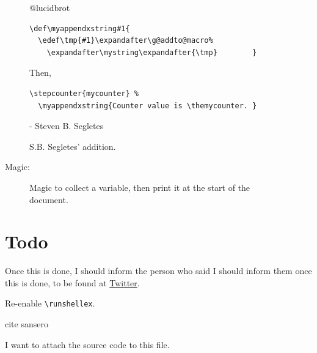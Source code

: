 \documentclass{article} \usepackage[utf8]{inputenc}
\makeatletter
\newcommand{\code}[1]{\colorbox{codebggray}{{\texttt{#1}}}}
\def\mystring{} %
\def\thefinalstring{} %
\def\myappendstring#1{\g@addto@macro\mystring{ #1}}
\def\myappendxstring#1{\edef\tmp{#1}\expandafter\g@addto@macro\expandafter\mystring\expandafter{\tmp}}
\makeatother
\begin{document}
\begin{figure}[hp]
\begin{myquote}
@lucidbrot
\begin{lstlisting}[columns=fullflexible, backgroundcolor = \color{codebggray}]
\def\myappendxstring#1{
  \edef\tmp{#1}\expandafter\g@addto@macro%
    \expandafter\mystring\expandafter{\tmp}        }
\end{lstlisting}
Then, \begin{lstlisting}[columns=fullflexible, backgroundcolor = \color{codebggray}]
\stepcounter{mycounter} %
  \myappendxstring{Counter value is \themycounter. }
\end{lstlisting}
 - Steven B. Segletes 
\end{myquote}
\caption{S.B. Segletes' addition.}
\label{fig:segletes}
\end{figure}

\makeatletter
{}%
\makeatother
Magic: \thefinalstring
\addtocontents{xyz}{\gdef\protect\thefinalstring{\mystring}}

\begin{figure}[htbp]
\begin{mycode}
\myappendstring{hello}
\makeatletter
{}%
\makeatother
\thefinalstring
\addtocontents{xyz}{\gdef\protect\thefinalstring{\mystring}}
\end{mycode}
\caption{Magic to collect a variable, then print it at the start of the document. }
\label{fig:magic}
\end{figure}

\section{Todo}
Once this is done, I should inform the person who said I should inform them once this is done, to be found at \href{https://twitter.com/LucidBrot/status/1290792953548615682}{Twitter}.

Re-enable \code{\textbackslash runshellex}.

cite sansero

I want to attach the source code to this file.
\end{document}

